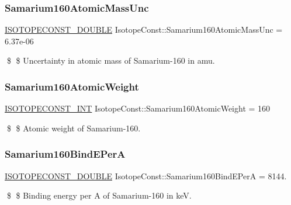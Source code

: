 \subsubsection{\texorpdfstring{Samarium160\+Atomic\+Mass\+Unc}{Samarium160AtomicMassUnc}}
{\footnotesize\ttfamily \mbox{\hyperlink{group___isotope_const-_macros_ga8f45a7272ce02c0b4c65c44636ed719a}{I\+S\+O\+T\+O\+P\+E\+C\+O\+N\+S\+T\+\_\+\+D\+O\+U\+B\+LE}} Isotope\+Const\+::\+Samarium160\+Atomic\+Mass\+Unc = 6.\+37e-\/06}

\$ \$ Uncertainty in atomic mass of Samarium-\/160 in amu. \mbox{\label{group___isotope_const-_samarium-_sm160_ga2d4b09d1b7f31d3700f7b19580339385}} 
\subsubsection{\texorpdfstring{Samarium160\+Atomic\+Weight}{Samarium160AtomicWeight}}
{\footnotesize\ttfamily \mbox{\hyperlink{group___isotope_const-_macros_ga5f18360b3e99483a35c32d789e62621c}{I\+S\+O\+T\+O\+P\+E\+C\+O\+N\+S\+T\+\_\+\+I\+NT}} Isotope\+Const\+::\+Samarium160\+Atomic\+Weight = 160}

\$ \$ Atomic weight of Samarium-\/160. \mbox{\label{group___isotope_const-_samarium-_sm160_ga6a6e8fa61eb46edb8f0f1ed4ee247abd}} 
\subsubsection{\texorpdfstring{Samarium160\+Bind\+E\+PerA}{Samarium160BindEPerA}}
{\footnotesize\ttfamily \mbox{\hyperlink{group___isotope_const-_macros_ga8f45a7272ce02c0b4c65c44636ed719a}{I\+S\+O\+T\+O\+P\+E\+C\+O\+N\+S\+T\+\_\+\+D\+O\+U\+B\+LE}} Isotope\+Const\+::\+Samarium160\+Bind\+E\+PerA = 8144.}

\$ \$ Binding energy per A of Samarium-\/160 in keV. \mbox{\label{group___isotope_const-_samarium-_sm160_ga6ae6d4216136cf146b5688d34876e42d}} 
